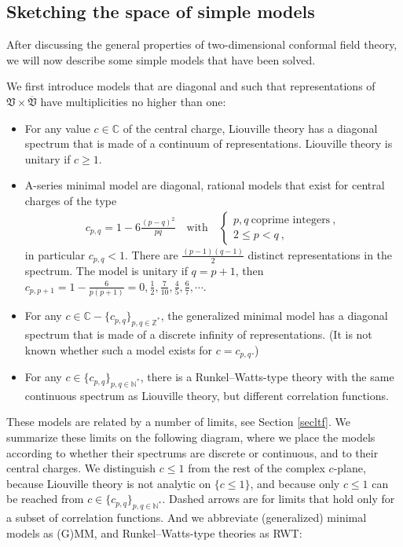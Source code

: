 \documentclass[12pt, a4paper, notitlepage, twoside]{report}
\numberwithin{equation}{section}
\theoremstyle{break}
\begin{document}
\subsection{Sketching the space of simple models \label{secmomo}}

After discussing the general properties of two-dimensional conformal field theory, we will now describe some simple models that have been solved.

We first introduce models that are diagonal and such that representations of $\mathfrak{V}\times \overline{\mathfrak{V}}$ have multiplicities no higher than one:
\begin{itemize}
 \item For any value $c\in\mathbb{C}$ of the central charge, Liouville theory
has a diagonal spectrum that is made of a continuum of representations.
Liouville theory is unitary if $c\geq 1$. 
\item A-series minimal model are diagonal, rational models that exist for central charges of the type
\begin{align}
 c_{p,q} = 1 - 6 \frac{(p-q)^2}{pq}  \quad \text{with} \quad \left\{\begin{array}{l}  p,q \ \text{coprime  integers}\ , \\ 2\leq p<q\ , \end{array}\right.  
\label{cpq}
\end{align}
in particular $c_{p,q} <1$.
There are $\frac{(p-1)(q-1)}{2}$ distinct representations in the spectrum.
The model is unitary if $q=p+1$, then $c_{p,p+1}=1-\frac{6}{p(p+1)}=0,\frac12,\frac{7}{10},\frac45, \frac67,\cdots$.
\item For any  $c\in\mathbb{C}-\{c_{p,q}\}_{p,q\in\mathbb{Z}^*}$, the generalized minimal model has a diagonal spectrum that is made of a discrete infinity of representations. (It is not known whether such a model exists for $c=c_{p,q}$.)
\item For any $c\in \{c_{p,q}\}_{p,q\in\mathbb{N}^*}$, there is a Runkel--Watts-type theory with the same continuous spectrum as Liouville theory, but different correlation functions. 
\end{itemize}
These models are related by a number of limits, see Section \ref{secltf}. 
We summarize these limits on the following diagram, where we place the models according to whether their spectrums are discrete or continuous, and to their central charges. 
We distinguish $c\leq 1$ from the rest of the complex $c$-plane, because Liouville theory is not analytic on $\{c\leq 1\}$, and because only $c\leq 1$ can be reached from $c\in \{c_{p,q}\}_{p,q\in \mathbb{N}^*}$. Dashed arrows are for limits that hold only for a subset of correlation functions. And we abbreviate (generalized) minimal models as (G)MM, and Runkel--Watts-type theories as RWT:
\end{document}

